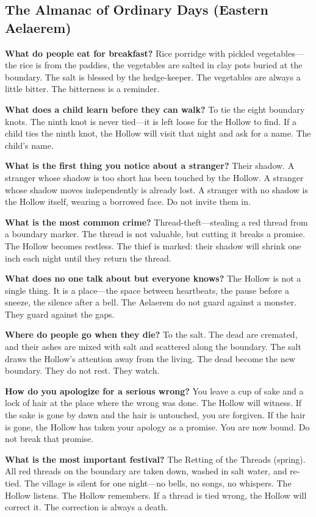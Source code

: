 \subsection*{The Almanac of Ordinary Days (Eastern Aelaerem)}
\begin{almanac}
\textbf{What do people eat for breakfast?} Rice porridge with pickled vegetables---the rice is from the paddies, the vegetables are salted in clay pots buried at the boundary. The salt is blessed by the hedge-keeper. The vegetables are always a little bitter. The bitterness is a reminder.

\textbf{What does a child learn before they can walk?} To tie the eight boundary knots. The ninth knot is never tied---it is left loose for the Hollow to find. If a child ties the ninth knot, the Hollow will visit that night and ask for a name. The child's name.

\textbf{What is the first thing you notice about a stranger?} Their shadow. A stranger whose shadow is too short has been touched by the Hollow. A stranger whose shadow moves independently is already lost. A stranger with no shadow is the Hollow itself, wearing a borrowed face. Do not invite them in.

\textbf{What is the most common crime?} Thread-theft---stealing a red thread from a boundary marker. The thread is not valuable, but cutting it breaks a promise. The Hollow becomes restless. The thief is marked: their shadow will shrink one inch each night until they return the thread.

\textbf{What does no one talk about but everyone knows?} The Hollow is not a single thing. It is a place---the space between heartbeats, the pause before a sneeze, the silence after a bell. The Aelaerem do not guard against a monster. They guard against the gaps.

\textbf{Where do people go when they die?} To the salt. The dead are cremated, and their ashes are mixed with salt and scattered along the boundary. The salt draws the Hollow's attention away from the living. The dead become the new boundary. They do not rest. They watch.

\textbf{How do you apologize for a serious wrong?} You leave a cup of sake and a lock of hair at the place where the wrong was done. The Hollow will witness. If the sake is gone by dawn and the hair is untouched, you are forgiven. If the hair is gone, the Hollow has taken your apology as a promise. You are now bound. Do not break that promise.

\textbf{What is the most important festival?} The Retting of the Threads (spring). All red threads on the boundary are taken down, washed in salt water, and re-tied. The village is silent for one night---no bells, no songs, no whispers. The Hollow listens. The Hollow remembers. If a thread is tied wrong, the Hollow will correct it. The correction is always a death.


\end{almanac}
